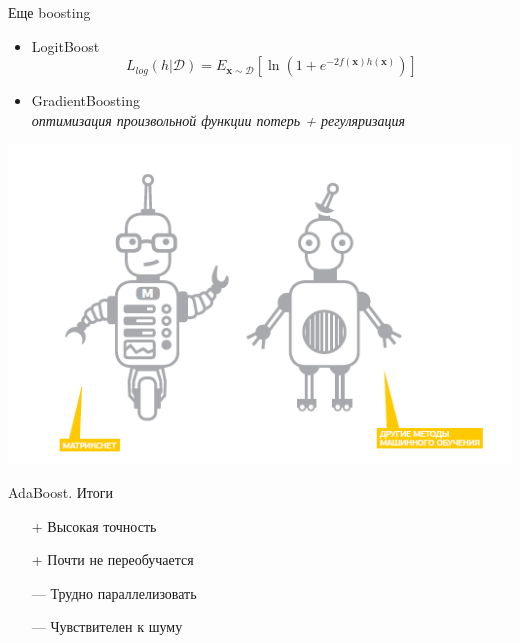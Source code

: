 \documentclass[10pt,a4paper]{beamer}
\begin{document}

\begin{frame}{Еще boosting}

\begin{itemize}
\item LogitBoost
\[
L_{log} (h | \mathcal{D}) = E_{\mathbf{x} \sim \mathcal{D}} \left[ \ln \left(1 + e^{-2 f(\mathbf{x}) h(\mathbf{x})}\right) \right]
\]
\item GradientBoosting \\
{\it оптимизация произвольной функции потерь + регуляризация}
\end{itemize}

\begin{center}
\includegraphics[scale=0.35]{images/matrixnet.png}
\end{center}

\end{frame}


\begin{frame}{AdaBoost. Итоги}

\begin{itemize}
\item[+] Высокая точность
\item[+] Почти не переобучается
\item[---] Трудно параллелизовать
\item[---] Чувствителен к шуму
\end{itemize}

\end{frame}

\end{document}
